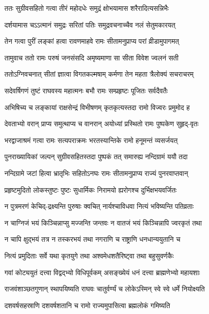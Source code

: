 \twolineshloka
{ततः सुग्रीवसहितो गत्वा तीरं महोदधेः}
{समुद्रं क्षोभयामास शरैरादित्यसन्निभैः}%

\twolineshloka
{दर्शयामास चऽऽत्मानं समुद्रः सरितां पतिः}
{समुद्रवचनाच्चैव नलं सेतुमकारयत्}%

\twolineshloka
{तेन गत्वा पुरीं लङ्कां हत्वा रावणमाहवे}
{रामः सीतामनुप्राप्य परां व्रीडामुपागमत्}%

\twolineshloka
{तामुवाच ततो रामः परुषं जनसंसदि}
{अमृष्यमाणा सा सीता विवेश ज्वलनं सती}%

\twolineshloka
{ततोऽग्निवचनात् सीतां ज्ञात्वा विगतकल्मषाम्}
{कर्मणा तेन महता त्रैलोक्यं सचराचरम्}%

\twolineshloka
{सदेवर्षिगणं तुष्टं राघवस्य महात्मनः}
{बभौ रामः सम्प्रहृष्टः पूजितः सर्वदैवतैः}%

\twolineshloka
{अभिषिच्य च लङ्कायां राक्षसेन्द्रं विभीषणम्}
{कृतकृत्यस्तदा रामो विज्वरः प्रमुमोद ह}%

\twolineshloka
{देवताभ्यो वरान् प्राप्य समुत्थाप्य च वानरान्}
{अयोध्यां प्रस्थितो रामः पुष्पकेण सुहृद्-वृतः}%

\twolineshloka
{भरद्वाजाश्रमं गत्वा रामः सत्यपराक्रमः}
{भरतस्यान्तिके रामो हनूमन्तं व्यसर्जयत्}%

\twolineshloka
{पुनराख्यायिकां जल्पन् सुग्रीवसहितस्तदा}
{पुष्पकं तत् समारुह्य नन्दिग्रामं ययौ तदा}%

\twolineshloka
{नन्दिग्रामे जटां हित्वा भ्रातृभिः सहितोऽनघः}
{रामः सीतामनुप्राप्य राज्यं पुनरवाप्तवान्}%

\twolineshloka
{प्रहृष्टमुदितो लोकस्तुष्टः पुष्टः सुधार्मिकः}
{निरामयो ह्यरोगश्च दुर्भिक्षभयवर्जितः}%

\twolineshloka
{न पुत्रमरणं केचिद्-द्रक्ष्यन्ति पुरुषाः क्वचित्}
{नार्यश्चाविधवा नित्यं भविष्यन्ति पतिव्रताः}%

\twolineshloka
{न चाग्निजं भयं किञ्चिन्नाप्सु मज्जन्ति जन्तवः}
{न वातजं भयं किञ्चिन्नापि ज्वरकृतं तथा}%

\twolineshloka
{न चापि क्षुद्भयं तत्र न तस्करभयं तथा}
{नगराणि च राष्ट्राणि धनधान्ययुतानि च}%

\twolineshloka
{नित्यं प्रमुदिताः सर्वे यथा कृतयुगे तथा}
{अश्वमेधशतैरिष्ट्वा तथा बहुसुवर्णकैः}%

\twolineshloka
{गवां कोट्ययुतं दत्त्वा विद्वद्‌भ्यो विधिपूर्वकम्}
{असङ्ख्येयं धनं दत्त्वा ब्राह्मणेभ्यो महायशाः}%

\twolineshloka
{राजवंशाञ्छतगुणान् स्थापयिष्यति राघवः}
{चातुर्वर्ण्यं च लोकेऽस्मिन् स्वे स्वे धर्मे नियोक्ष्यति}%

\twolineshloka
{दशवर्षसहस्राणि दशवर्षशतानि च}
{रामो राज्यमुपासित्वा ब्रह्मलोकं गमिष्यति}%

